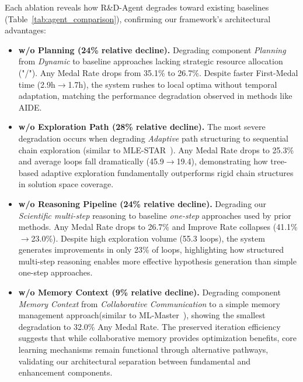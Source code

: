 \vspace{-10pt}  

Each ablation reveals how R\&D-Agent degrades toward existing baselines (Table~\ref{tab:agent_comparison}), confirming our framework's architectural advantages:

\begin{itemize}[leftmargin=4ex, itemsep=0pt]

\item \textbf{w/o Planning (24\% relative decline).} Degrading component \textit{Planning} from \textit{Dynamic} to baseline approaches lacking strategic resource allocation ("/"). Any Medal Rate drops from 35.1\% to 26.7\%. Despite faster First-Medal time (2.9h$\rightarrow$1.7h), the system rushes to local optima without temporal adaptation, matching the performance degradation observed in methods like AIDE.

\item \textbf{w/o Exploration Path (28\% relative decline).} The most severe degradation occurs when degrading \textit{Adaptive} path structuring to sequential chain exploration (similar to MLE-STAR~\citep{nam2025mle}). Any Medal Rate drops to 25.3\% and average loops fall dramatically (45.9$\rightarrow$19.4), demonstrating how tree-based adaptive exploration fundamentally outperforms rigid chain structures in solution space coverage.

\item \textbf{w/o Reasoning Pipeline (24\% relative decline).} Degrading our \textit{Scientific multi-step} reasoning to baseline \textit{one-step} approaches used by prior methods. Any Medal Rate drops to 26.7\% and Improve Rate collapses (41.1\%$\rightarrow$23.0\%). Despite high exploration volume (55.3 loops), the system generates improvements in only 23\% of loops, highlighting how structured multi-step reasoning enables more effective hypothesis generation than simple one-step approaches.

\item \textbf{w/o Memory Context (9\% relative decline).} Degrading component \textit{Memory Context} from \textit{Collaborative Communication} to a simple memory management approach(similar to ML-Master~\citep{liu2025ml}), showing the smallest degradation to 32.0\% Any Medal Rate. The preserved iteration efficiency suggests that while collaborative memory provides optimization benefits, core learning mechanisms remain functional through alternative pathways, validating our architectural separation between fundamental and enhancement components.
\end{itemize}

